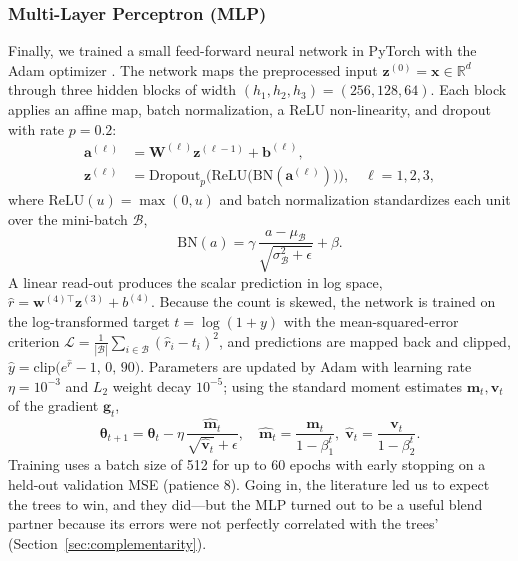 \documentclass[journal]{IEEEtran}
\begin{document}
\subsubsection{Multi-Layer Perceptron (MLP)}
\label{sec:mlp}
Finally, we trained a small feed-forward neural network in PyTorch
\cite{paszke2019pytorch} with the Adam optimizer \cite{kingma2015adam}.
The network maps the preprocessed input
$\mathbf{z}^{(0)}=\mathbf{x}\in\mathbb{R}^{d}$ through three hidden blocks of
width $(h_1,h_2,h_3)=(256,128,64)$. Each block applies an affine map, batch
normalization, a ReLU non-linearity, and dropout with rate $p=0.2$:
\begin{align}
\mathbf{a}^{(\ell)} &= \mathbf{W}^{(\ell)}\mathbf{z}^{(\ell-1)}+\mathbf{b}^{(\ell)},
\label{eq:mlp_aff}\\
\mathbf{z}^{(\ell)} &= \mathrm{Dropout}_{p}\!\Big(\mathrm{ReLU}\big(
\mathrm{BN}(\mathbf{a}^{(\ell)})\big)\Big),\quad \ell=1,2,3,
\label{eq:mlp_block}
\end{align}
where $\mathrm{ReLU}(u)=\max(0,u)$ and batch normalization standardizes each
unit over the mini-batch $\mathcal{B}$,
\begin{equation}
\mathrm{BN}(a)=\gamma\,\frac{a-\mu_{\mathcal{B}}}{\sqrt{\sigma_{\mathcal{B}}^{2}+\epsilon}}+\beta .
\label{eq:bn}
\end{equation}
A linear read-out produces the scalar prediction in log space,
$\hat r=\mathbf{w}^{(4)\top}\mathbf{z}^{(3)}+b^{(4)}$. Because the count is
skewed, the network is trained on the log-transformed target
$t=\log(1+y)$ with the mean-squared-error criterion
$\mathcal{L}=\tfrac{1}{|\mathcal{B}|}\sum_{i\in\mathcal{B}}(\hat r_i-t_i)^2$, and
predictions are mapped back and clipped,
$\hat y=\mathrm{clip}\big(e^{\hat r}-1,\,0,\,90\big)$. Parameters are updated by
Adam with learning rate $\eta=10^{-3}$ and $L_2$ weight decay $10^{-5}$; using
the standard moment estimates $\mathbf{m}_t,\mathbf{v}_t$ of the gradient
$\mathbf{g}_t$,
\begin{equation}
\boldsymbol{\theta}_{t+1}=\boldsymbol{\theta}_{t}
-\eta\,\frac{\hat{\mathbf m}_t}{\sqrt{\hat{\mathbf v}_t}+\epsilon},
\quad
\hat{\mathbf m}_t=\frac{\mathbf m_t}{1-\beta_1^{t}},\;
\hat{\mathbf v}_t=\frac{\mathbf v_t}{1-\beta_2^{t}}.
\label{eq:adam}
\end{equation}
Training uses a batch size of 512 for up to 60 epochs with early stopping on a
held-out validation MSE (patience 8). Going in, the literature
\cite{tang2024,camatti2024} led us to expect the trees to win, and they
did---but the MLP turned out to be a useful blend partner because its errors
were not perfectly correlated with the trees' (Section~\ref{sec:complementarity}).
\end{document}
